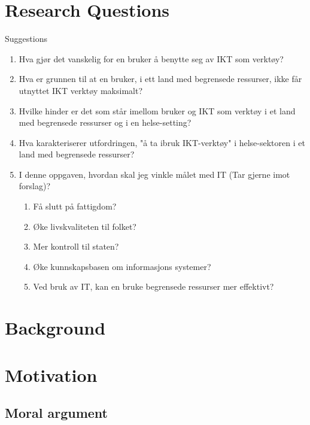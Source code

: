 \section{Research Questions}
\large{Suggestions}
\begin{enumerate}
\item Hva gjør det vanskelig for en bruker å benytte seg av IKT som verktøy?
\item Hva er grunnen til at en bruker, i ett land med begrensede ressurser, ikke får utnyttet IKT verktøy maksimalt?
\item Hvilke hinder er det som står imellom bruker og IKT som verktøy i et land med begrensede ressurser og i en helse-setting?
\item Hva karakteriserer utfordringen, "å ta ibruk IKT-verktøy" i helse-sektoren i et land med begrensede ressurser?
\item I denne oppgaven, hvordan skal jeg vinkle målet med IT (Tar gjerne imot forslag)?
	\begin{enumerate}
	\item Få slutt på fattigdom?
	\item Øke livskvaliteten til folket?
	\item Mer kontroll til staten?
	\item Øke kunnskapsbasen om informasjons systemer?
	\item Ved bruk av IT, kan en bruke begrensede ressurser mer effektivt?
	\end{enumerate}
\end{enumerate}

\section{Background}

\section{Motivation}
\subsection{Moral argument}

